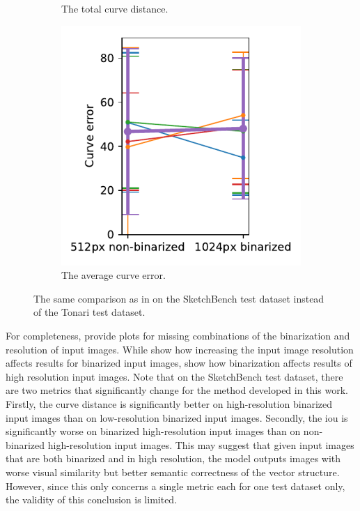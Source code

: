 \begin{figure}[h]
\begin{subfigure}{.3\textwidth}
    \caption{The total curve distance.}
\end{subfigure}
    \begin{subfigure}{.3\textwidth}
    \centering
    \includegraphics[width=\textwidth]{graphics/eval/curve error_res_binarization_sketchbench.pdf}
    \caption{The average curve error.}
\end{subfigure}
    \caption{The same comparison as in  on the SketchBench test dataset instead of the Tonari test dataset.}
    \label{fig:res_binarization_comparison.sketchbench}
\end{figure}

For completeness,  provide plots for missing combinations of the binarization and resolution of input images. While  show how increasing the input image resolution affects results for binarized input images,  show how binarization affects results of high resolution input images. Note that on the SketchBench test dataset, there are two metrics that significantly change for the method developed in this work. Firstly, the curve distance is significantly better on high-resolution binarized input images than on low-resolution binarized input images. Secondly, the \gls{iou} is significantly worse on binarized high-resolution input images than on non-binarized high-resolution input images. This may suggest that given input images that are both binarized and in high resolution, the model outputs images with worse visual similarity but better semantic correctness of the vector structure. However, since this only concerns a single metric each for one test dataset only, the validity of this conclusion is limited.

